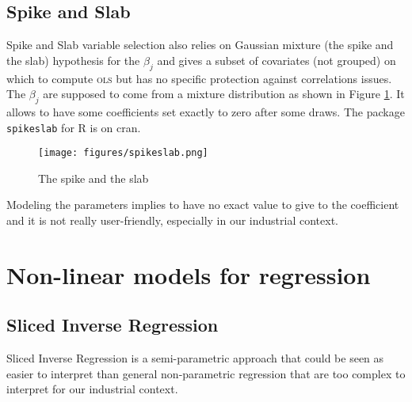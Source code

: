 \documentclass[12pt,a4paper]{report}
\begin{document}
		\subsection{Spike and Slab}			%

			Spike and Slab variable selection \cite{ishwaran2005spike} also relies on Gaussian mixture (the spike and the slab) hypothesis for the $\beta_j$ and gives a subset of covariates (not grouped) on which to compute \textsc{ols} but has no specific protection against correlations issues.  The $\beta_j$ are supposed to come from a mixture distribution as shown in Figure \ref{spikeslab}. It allows to have some coefficients set exactly to zero after some draws. The package {\tt spikeslab} for R is on {\sc cran}. \\
			
\begin{figure}[h!]
	\centering
	\texttt{[image: figures/spikeslab.png]} 
	\caption{The spike and the slab}\label{spikeslab}
\end{figure}		
		
		Modeling the parameters implies to have no exact value to give to the coefficient and it is not really user-friendly, especially in our industrial context. %
		
		\FloatBarrier
	
		
		
		
		\section{Non-linear models for regression}	
			
	\subsection{Sliced Inverse Regression}
		Sliced Inverse Regression is a semi-parametric approach that could be seen as easier to interpret than general non-parametric regression \cite{eubank1999nonparametric,hardle1990applied} that are too complex to interpret for our industrial context. \\
		
\end{document}
